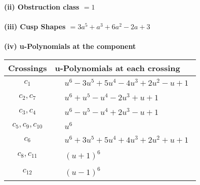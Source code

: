 \documentclass[1p]{elsarticle_modified}
\theoremstyle{definition}
\begin{document}
\flushleft \textbf{(ii) Obstruction class $= 1$}\\~\\
\flushleft \textbf{(iii) Cusp Shapes $= 3 a^5+a^3+6 a^2-2 a+3$}\\~\\
\newpage\renewcommand{\arraystretch}{1}
\flushleft \textbf{(iv) u-Polynomials at the component}\newline \\
\begin{tabular}{m{50pt}|m{274pt}}
Crossings & \hspace{64pt}u-Polynomials at each crossing \\
\hline $$\begin{aligned}c_{1}\end{aligned}$$&$\begin{aligned}
&u^6-3 u^5+5 u^4-4 u^3+2 u^2- u+1
\end{aligned}$\\
\hline $$\begin{aligned}c_{2},c_{7}\end{aligned}$$&$\begin{aligned}
&u^6+u^5- u^4-2 u^3+u+1
\end{aligned}$\\
\hline $$\begin{aligned}c_{3},c_{4}\end{aligned}$$&$\begin{aligned}
&u^6- u^5- u^4+2 u^3- u+1
\end{aligned}$\\
\hline $$\begin{aligned}c_{5},c_{9},c_{10}\end{aligned}$$&$\begin{aligned}
&u^6
\end{aligned}$\\
\hline $$\begin{aligned}c_{6}\end{aligned}$$&$\begin{aligned}
&u^6+3 u^5+5 u^4+4 u^3+2 u^2+u+1
\end{aligned}$\\
\hline $$\begin{aligned}c_{8},c_{11}\end{aligned}$$&$\begin{aligned}
&(u+1)^6
\end{aligned}$\\
\hline $$\begin{aligned}c_{12}\end{aligned}$$&$\begin{aligned}
&(u-1)^6
\end{aligned}$\\
\hline
\end{tabular}\\~\\
\end{document}

